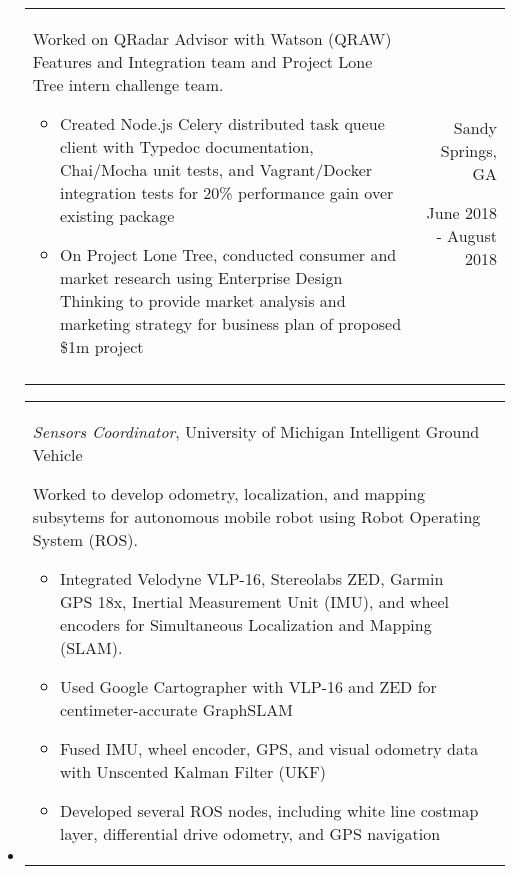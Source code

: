 \documentclass[9pt]{memoir}
\begin{document}
\begin{itemize}
\begin{tabular}[t]{lr}
\begin{minipage}[t]{0.7 \textwidth}
Worked on QRadar Advisor with Watson (QRAW) Features and Integration team and Project Lone
Tree intern challenge team.

\begin{itemize}
\item Created Node.js Celery distributed task queue client with Typedoc documentation, Chai/Mocha
      unit tests, and Vagrant/Docker integration tests for 20\% performance gain over existing
      package
\item On Project Lone Tree, conducted consumer and market research using Enterprise Design Thinking
      to provide market analysis and marketing strategy for business plan of proposed \$1m project
\end{itemize}

\end{minipage}

&

\begin{minipage}[t]{0.2 \textwidth}
\raggedleft

\normalsize
Sandy Springs, GA

\small
June 2018 - August 2018
\end{minipage}

\\ \\

\end{tabular}

\item

\begin{tabular}[t]{lr}

\begin{minipage}[t]{0.7 \textwidth}
\raggedright

\normalsize
\textit{Sensors Coordinator}, University of Michigan Intelligent Ground Vehicle

\small

Worked to develop odometry, localization, and mapping subsytems for autonomous mobile robot
using Robot Operating System (ROS).

\begin{itemize}
\item Integrated Velodyne VLP-16, Stereolabs ZED, Garmin GPS 18x, Inertial Measurement Unit (IMU),
      and wheel encoders for Simultaneous Localization and Mapping (SLAM).
\item Used Google Cartographer with VLP-16 and ZED for centimeter-accurate GraphSLAM
\item Fused IMU, wheel encoder, GPS, and visual odometry data with Unscented Kalman Filter (UKF)
\item Developed several ROS nodes, including white line costmap layer, differential drive odometry, and GPS navigation
\end{itemize}


\end{minipage}
\end{tabular}
\end{itemize}
\end{document}
